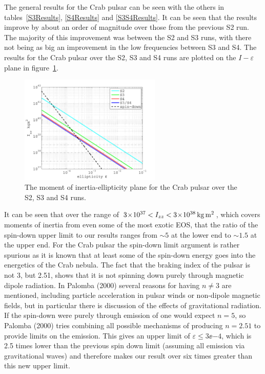 The general results for the Crab pulsar can be seen with the others in tables~\ref{S3Results},
\ref{S4Results} and \ref{S3S4Results}. It can be seen that the results improve by about an order of
magnitude over those from the previous S2 run. The majority of this improvement was between the S2
and S3 runs, with there not being as big an improvement in the low frequencies between S3 and S4.
The results for the Crab pulsar over the S2, S3 and S4 runs are plotted on the $I-\varepsilon$ plane
in figure~\ref{CrabIeplane}.
\begin{figure}[!htbp]
\begin{center}
\includegraphics[width=0.6\textwidth]{figs/CrabIeplane}\caption{The moment of inertia-ellipticity
plane for the Crab pulsar over the S2, S3 and S4 runs.}\label{CrabIeplane}
\end{center}
\end{figure}
It can be seen that over the range of $3\!\times\!10^{37} < I_{zz} < 3\!\times\!10^{38}\,{\rm kg}\,{\rm m}^2$, which
covers moments of inertia from even some of the most exotic EOS, that the ratio of the spin-down
upper limit to our results ranges from $\sim 5$ at the lower end to $\sim 1.5$ at the upper end. For
the Crab pulsar the spin-down limit argument is rather spurious as it is known that at least some of
the spin-down energy goes into the energetics of the Crab nebula. The fact that the braking index
of the pulsar is not 3, but 2.51, shows that it is not spinning down purely through magnetic dipole
radiation. In Palomba (2000) \cite{Palomba:2000} several reasons for having $n \ne 3$ are mentioned,
including particle acceleration in pulsar winds or non-dipole magnetic fields, but in particular
there is discussion of the effects of gravitational radiation. If the spin-down were purely through
emission of \gws one would expect $n=5$, so Palomba (2000) \cite{Palomba:2000} tries combining all
possible mechanisms of producing $n=2.51$ to provide limits on the \gw emission. This gives an upper
limit of $\varepsilon \le 3\ee{-4}$, which is 2.5 times lower than the previous spin down limit
(assuming all emission via gravitational waves) and therefore makes our result over six times
greater than this new upper limit.

